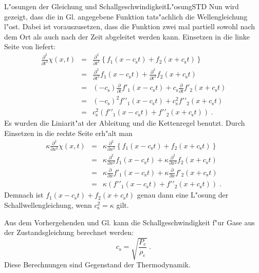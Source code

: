 \begin{MXContent}{L"osungen der Gleichung und Schallgeschwindigkeit}{L"osung}{STD}
Nun wird gezeigt, dass die in Gl.  angegebene Funktion tats"achlich die Wellengleichung l"ost. Dabei ist vorauszusetzen, dass die Funktion zwei mal partiell sowohl nach dem Ort als auch nach der Zeit abgeleitet werden kann. Einsetzen in die linke Seite von  liefert:
\begin{eqnarray*}
  \frac{\partial^2}{\partial t^2}\chi(x,t) &=& \frac{\partial^2}{\partial t^2} \left\{f_1(x-c_\mathrm{s}t)+f_2(x+c_\mathrm{s}t)\right\}\\
    &=& \frac{\partial^2}{\partial t^2}f_1(x-c_\mathrm{s}t)+\frac{\partial^2}{\partial t^2}f_2(x+c_\mathrm{s}t)\\
    &=& (-c_\mathrm{s})\frac{\partial}{\partial t}f'_1(x-c_\mathrm{s}t)+c_\mathrm{s}\frac{\partial}{\partial t}f'_2(x+c_\mathrm{s}t)\\
    &=& (-c_\mathrm{s})^2f'{'}_1(x-c_\mathrm{s}t)+c_\mathrm{s}^2f'{'}_2(x+c_\mathrm{s}t)\\
    &=& c_\mathrm{s}^2\left(f'{'}_1(x-c_\mathrm{s}t)+f'{'}_2(x+c_\mathrm{s}t)\right)\;.
\end{eqnarray*}
Es wurden die Liniarit"at der Ableitung und die Kettenregel benutzt. Durch Einsetzen in die rechte Seite erh"alt man
\begin{eqnarray*}
  \kappa\frac{\partial^2}{\partial x^2}\chi(x,t) &=& \kappa\frac{\partial^2}{\partial x^2} \left\{f_1(x-c_\mathrm{s}t)+f_2(x+c_\mathrm{s}t)\right\}\\
    &=& \kappa\frac{\partial^2}{\partial x^2}f_1(x-c_\mathrm{s}t)+\kappa\frac{\partial^2}{\partial x^2}f_2(x+c_\mathrm{s}t)\\
    &=& \kappa\frac{\partial}{\partial x}f'_1(x-c_\mathrm{s}t)+\kappa\frac{\partial}{\partial x}f'_2(x+c_\mathrm{s}t)\\
    &=& \kappa\left(f'{'}_1(x-c_\mathrm{s}t)+f{'}'_2(x+c_\mathrm{s}t)\right)\;.
\end{eqnarray*}
Demnach ist $f_1(x-c_\mathrm{s}t)+f_2(x+c_\mathrm{s}t)$ genau dann eine L"osung der Schallwellengleichung, wenn $c_\mathrm{s}^2=\kappa$ gilt.

\begin{MInfo}
Aus dem Vorhergehenden und Gl.  kann die Schallgeschwindigkeit f"ur Gase aus der Zustandsgleichung berechnet werden:
\begin{equation}
  c_\mathrm{s}=\sqrt{\frac{P_e}{\rho_e}}\;.
\end{equation}
Diese Berechnungen sind Gegenstand der Thermodynamik.
\end{MInfo} 
\end{MXContent}


